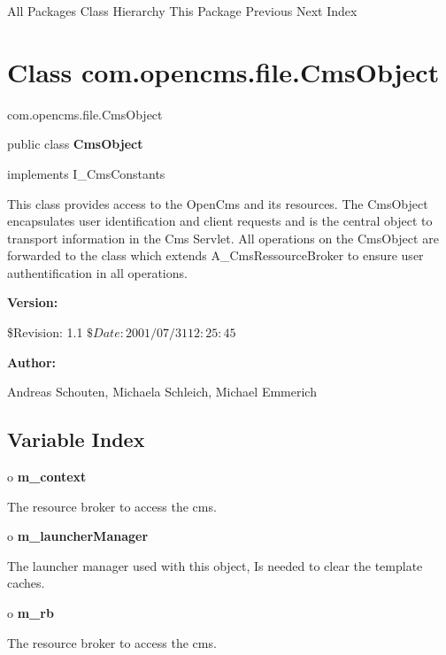 \begin{PRE}
All Packages  Class Hierarchy  This Package  Previous  Next  Index
\end{PRE}

\htmlHR

\section{  Class com.opencms.file.CmsObject }

\begin{PRE}
com.opencms.file.CmsObject
\end{PRE}

\htmlHR

\begin{description}
\item public class {\bf CmsObject}  
\item implements I\_CmsConstants 
\end{description}

This class provides access to the OpenCms and its resources. \htmlBR
The CmsObject encapsulates user identification and client requests and is the
central object to transport information in the Cms Servlet. \htmlBR
All operations on the CmsObject are forwarded to the class which extends
A\_CmsRessourceBroker to ensure user authentification in all operations. 

\begin{description}
\item {\bf Version:}  

\$Revision: 1.1 $ \$Date: 2001/07/31 12:25:45 $  
\item {\bf Author:}  

Andreas Schouten, Michaela Schleich, Michael Emmerich 
\end{description}

\htmlHR

\subsection*{  Variable Index }

\begin{description}
\item o {\bf m\_context}  

The resource broker to access the cms.  
\item o {\bf m\_launcherManager}  

The launcher manager used with this object, Is needed to clear the template
caches.  
\item o {\bf m\_rb}  

The resource broker to access the cms. 
\end{description}

